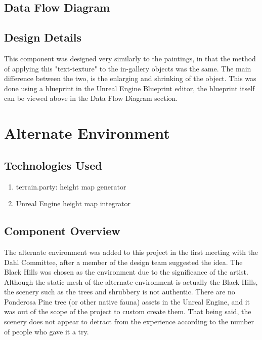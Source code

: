 \subsection{Data Flow Diagram}

\subsection{Design Details}
This component was designed very similarly to the paintings, in that the method of applying this "text-texture" to the in-gallery objects was the same.  The main difference between the two, is the enlarging and shrinking of the object.  This was done using a blueprint in the Unreal Engine Blueprint editor, the blueprint itself can be viewed above in the Data Flow Diagram section.  

\section{Alternate Environment}

\subsection{Technologies Used}
\begin{enumerate}
\item terrain.party:  height map generator
\item Unreal Engine height map integrator
\end{enumerate}

\subsection{Component Overview}
The alternate environment was added to this project in the first meeting with the Dahl Committee, after a member of the design team suggested the idea.  The Black Hills was chosen as the environment due to the significance of the artist. 
Although the static mesh of the alternate environment is actually the Black Hills, the scenery such as the trees and shrubbery is not authentic.  There are no Ponderosa Pine tree (or other native fauna) assets in the Unreal Engine, and it was out of the scope of the project to custom create them.  That being said, the scenery does not appear to detract from the experience according to the number of people who gave it a try.


